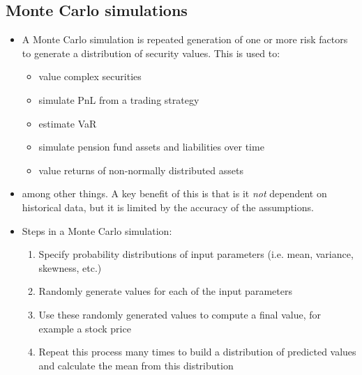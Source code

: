 \documentclass[../notes_compiled.tex]{subfiles}
\begin{document}
\subsection{Monte Carlo simulations}

\begin{itemize}
\item A Monte Carlo simulation is repeated generation of one or more risk factors to generate a distribution of security values. This is used to:
\begin{itemize}
\item value complex securities
\item simulate PnL from a trading strategy
\item estimate VaR
\item simulate pension fund assets and liabilities over time
\item value returns of non-normally distributed assets
\end{itemize}
\item[] among other things. A key benefit of this is that is it \emph{not} dependent on historical data, but it is limited by the accuracy of the assumptions.
\item Steps in a Monte Carlo simulation:
\begin{enumerate}
\item Specify probability distributions of input parameters (i.e. mean, variance, skewness, etc.)
\item Randomly generate values for each of the input parameters
\item Use these randomly generated values to compute a final value, for example a stock price
\item Repeat this process many times to build a distribution of predicted values and calculate the mean from this distribution
\end{enumerate}
\end{itemize}
\end{document}
